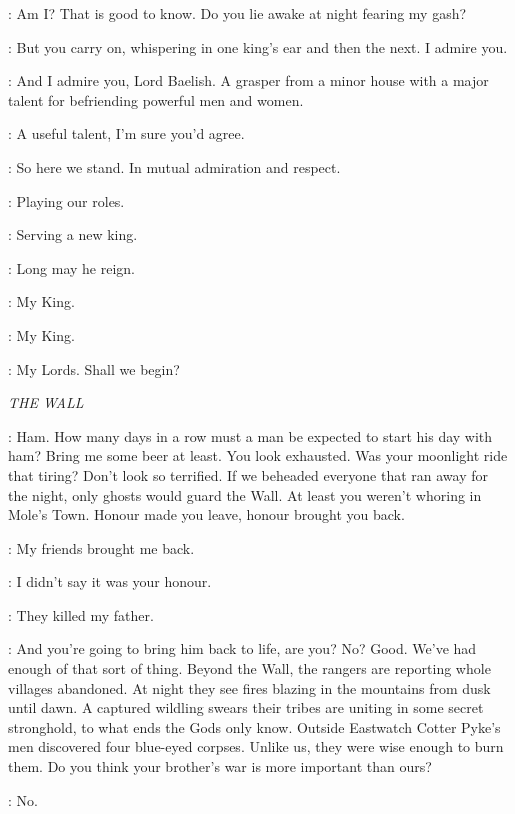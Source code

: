 \VARYS: Am I? That is good to know. Do you lie awake at night fearing my gash? 

\LITTLEFINGER: But you carry on, whispering in one king's ear and then the next. I admire you. 

\VARYS: And I admire you, Lord Baelish. A grasper from a minor house with a major talent for befriending powerful men and women. 

\LITTLEFINGER: A useful talent, I'm sure you'd agree. 

\VARYS: So here we stand. In mutual admiration and respect. 

\LITTLEFINGER: Playing our roles. 

\VARYS: Serving a new king. 

\LITTLEFINGER: Long may he reign. 


\LITTLEFINGER: My King. 

\VARYS: My King. 

\JOFFREY: My Lords. Shall we begin? 



\scene

\textit{THE WALL}


\JEOR: Ham. How many days in a row must a man be expected to start his day with ham? Bring me some beer at least. You look exhausted. Was your moonlight ride that tiring? Don't look so terrified. If we beheaded everyone that ran away for the night, only ghosts would guard the Wall. At least you weren't whoring in Mole's Town. Honour made you leave, honour brought you back. 

\JON: My friends brought me back. 

\JEOR: I didn't say it was your honour. 

\JON: They killed my father. 

\JEOR: And you're going to bring him back to life, are you? No? Good. We've had enough of that sort of thing. Beyond the Wall, the rangers are reporting whole villages abandoned. At night they see fires blazing in the mountains from dusk until dawn. A captured wildling swears their tribes are uniting in some secret stronghold, to what ends the Gods only know. Outside Eastwatch Cotter Pyke's men discovered four blue-eyed corpses. Unlike us, they were wise enough to burn them. Do you think your brother's war is more important than ours? 

\JON: No. 

